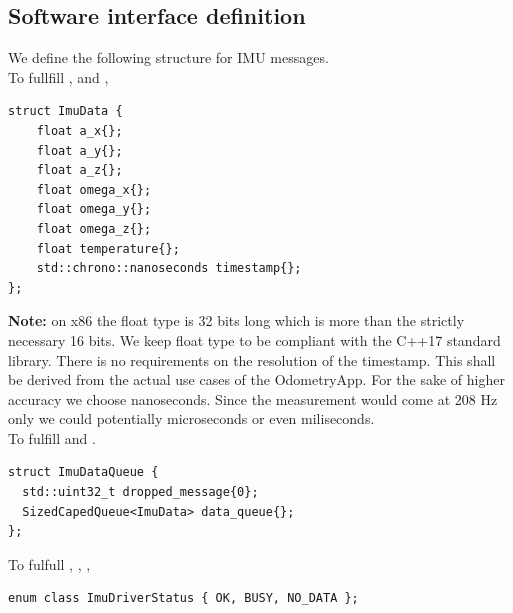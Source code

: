 \subsection{Software interface definition}
We define the following structure for IMU messages.\\
To fullfill ,  and ,
\begin{lstlisting}[style=cppstyle]
struct ImuData {
    float a_x{};
    float a_y{};
    float a_z{};
    float omega_x{};
    float omega_y{};
    float omega_z{};
    float temperature{};
    std::chrono::nanoseconds timestamp{};
};
\end{lstlisting}
\textbf{Note:} on x86 the float type is 32 bits long which is more than the strictly necessary 16 bits. We keep float type to be compliant with the C++17 standard library.
There is no requirements on the resolution of the timestamp. This shall be derived from the actual use cases of the OdometryApp.
For the sake of higher accuracy we choose nanoseconds.
Since the measurement would come at 208 Hz only we could potentially microseconds or even miliseconds.\\

To fulfill  and .
\begin{lstlisting}[style=cppstyle]
struct ImuDataQueue {
  std::uint32_t dropped_message{0};
  SizedCapedQueue<ImuData> data_queue{};
};
\end{lstlisting}

To fulfull , , ,
\begin{lstlisting}[style=cppstyle]
enum class ImuDriverStatus { OK, BUSY, NO_DATA };
\end{lstlisting}
